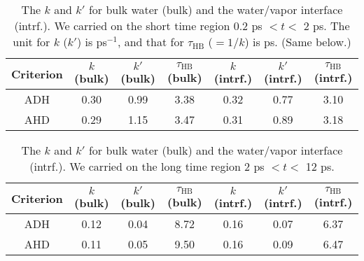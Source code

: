 \begin{table}[htb]
\centering
\caption{\label{tab:k_k_prime_128w_pure_1} 
    The $k$ and $k'$ for bulk water (bulk) and the water/vapor interface (intrf.). We carried on the short time region 0.2 ps $< t <$ 2 ps. 
    The unit for $k$ ($k'$) is ps$^{-1}$, and that for $\tau_{\text{HB}}$ ($=1/k$) is ps. (Same below.)
} 
\begin{tabular}{ccccccc}
 Criterion & $k$  (bulk) & $k'$ (bulk) & $\tau_{\text{HB}}$ (bulk) & $k$  (intrf.) & $k'$ (intrf.) & $\tau_{\text{HB}}$ (intrf.)\\
\hline
  ADH & 0.30  & 0.99 & 3.38  & 0.32 & 0.77 & 3.10 \\
  AHD & 0.29 & 1.15 & 3.47 & 0.31 & 0.89 & 3.18 \\
\end{tabular}
\end{table}
%
\begin{table}[htb]
\centering
\caption{\label{tab:k_k_prime_128w_pure_2} 
    The $k$ and $k'$ for bulk water (bulk) and the water/vapor interface (intrf.). We carried on the long time region 2 ps $< t <$ 12 ps.
} 
\begin{tabular}{ccccccc}
 Criterion & $k$  (bulk) & $k'$ (bulk) & $\tau_{\text{HB}}$ (bulk) & $k$  (intrf.) & $k'$ (intrf.) & $\tau_{\text{HB}}$ (intrf.)\\
\hline
  ADH & 0.12  & 0.04 & 8.72 & 0.16  & 0.07 & 6.37\\
  AHD & 0.11  & 0.05 & 9.50 & 0.16  & 0.09 & 6.47 \\
\end{tabular}
\end{table}
% 

